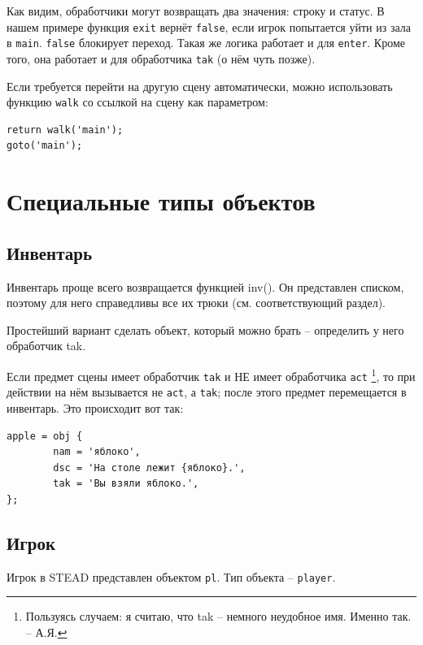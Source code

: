 \documentclass[12pt]{article}
\begin{document}
Как видим, обработчики могут возвращать два значения: строку и статус. В нашем примере функция \verb/exit/ вернёт \verb/false/, если игрок попытается уйти из зала в \verb/main/. \verb/false/ блокирует переход. Такая же логика работает и для \verb/enter/. Кроме того, она работает и для обработчика \verb/tak/ (о нём чуть позже).

Если требуется перейти на другую сцену автоматически, можно использовать функцию \verb/walk/ со ссылкой на сцену как параметром:

\begin{verbatim}
return walk('main');
goto('main');
\end{verbatim}

\section{Специальные типы объектов}

\subsection{Инвентарь}


Инвентарь проще всего возвращается функцией inv(). Он представлен списком, поэтому для него справедливы все их трюки (см. соответствующий раздел).

Простейший вариант сделать объект, который можно брать -- определить у него обработчик tak.

Если предмет сцены имеет обработчик \verb/tak/ и НЕ имеет обработчика \verb/act/ \footnote{Пользуясь случаем: я считаю, что tak -- немного неудобное имя. Именно так. -- А.Я.}, то при действии на нём вызывается не \verb/act/, а \verb/tak/; после этого предмет перемещается в инвентарь. Это происходит вот так:

\begin{verbatim}
apple = obj {
        nam = 'яблоко',
        dsc = 'На столе лежит {яблоко}.',
        tak = 'Вы взяли яблоко.',
};
\end{verbatim}

\subsection{Игрок}

Игрок в STEAD представлен объектом \verb/pl/. Тип объекта -- \verb/player/.
\end{document}

